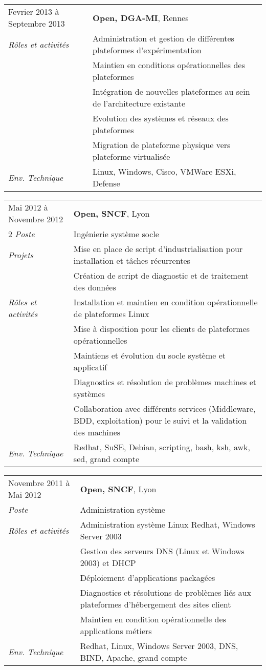 \documentclass[a4paper,8pt]{article}
\begin{document}
\begin{tabular}{P{3.5cm}|p{13cm}}
Fevrier 2013 à Septembre 2013	& \textbf{Open, DGA-MI}, Rennes\\
\textsl{Rôles et activités}	& Administration et gestion de différentes plateformes d'expérimentation\\
				& Maintien en conditions opérationnelles des plateformes\\
				& Intégration de nouvelles plateformes au sein de l'architecture existante\\
				& Evolution des systèmes et réseaux des plateformes\\
				& Migration de plateforme physique vers plateforme virtualisée\\
\textsl{Env. Technique}		& Linux, Windows, Cisco, VMWare ESXi, Defense\\
\end{tabular}
\begin{tabular}{P{3.5cm}|p{13cm}}
Mai 2012 à Novembre 2012	& \textbf{Open, SNCF}, Lyon\\2
\textsl{Poste}			& Ingénierie système socle\\
\textsl{Projets}		& Mise en place de script d'industrialisation pour installation et tâches récurrentes\\
				& Création de script de diagnostic et de traitement des données\\
\textsl{Rôles et activités}	& Installation et maintien en condition opérationnelle de plateformes Linux\\
				& Mise à disposition pour les clients de plateformes opérationnelles\\
				& Maintiens et évolution du socle système et applicatif\\
				& Diagnostics et résolution de problèmes machines et systèmes\\
				& Collaboration avec différents services (Middleware, BDD, exploitation) pour le suivi et la validation des machines\\
\textsl{Env. Technique}		& Redhat, SuSE, Debian, scripting, bash, ksh, awk, sed, grand compte\\
\end{tabular}
\begin{tabular}{P{3.5cm}|p{13cm}}
Novembre 2011 à Mai 2012	& \textbf{Open, SNCF}, Lyon\\
\textsl{Poste}			& Administration système\\
\textsl{Rôles et activités} 	& Administration système Linux Redhat, Windows Server 2003\\
				& Gestion des serveurs DNS (Linux et Windows 2003) et DHCP\\
				& Déploiement d'applications packagées\\
				& Diagnostics et résolutions de problèmes liés aux plateformes d'hébergement des sites client\\
				& Maintien en condition opérationnelle des applications métiers\\
\textsl{Env. Technique}		& Redhat, Linux, Windows Server 2003, DNS, BIND, Apache, grand compte\\
\end{tabular}
\end{document}
